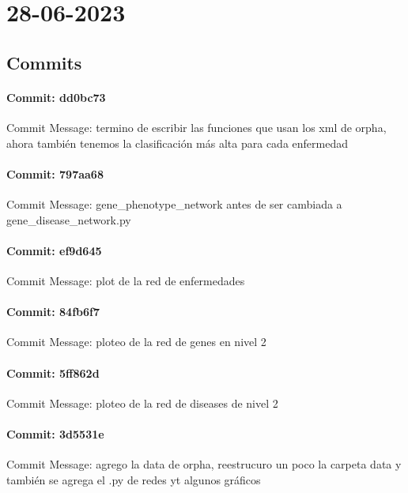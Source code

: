 \documentclass{article}
\begin{document}
\section{28-06-2023}
\subsection{Commits}
\paragraph{Commit: dd0bc73}
Commit Message: termino de escribir las funciones que usan los xml de orpha, ahora también tenemos la clasificación más alta para cada enfermedad

\paragraph{Commit: 797aa68}
Commit Message: gene_phenotype_network antes de ser cambiada a gene_disease_network.py

\paragraph{Commit: ef9d645}
Commit Message: plot de la red de enfermedades

\paragraph{Commit: 84fb6f7}
Commit Message: ploteo de la red de genes en nivel 2

\paragraph{Commit: 5ff862d}
Commit Message: ploteo de la red de diseases de nivel 2

\paragraph{Commit: 3d5531e}
Commit Message: agrego la data de orpha, reestrucuro un poco la carpeta data y también se agrega el .py de redes yt algunos gráficos

\end{document}
